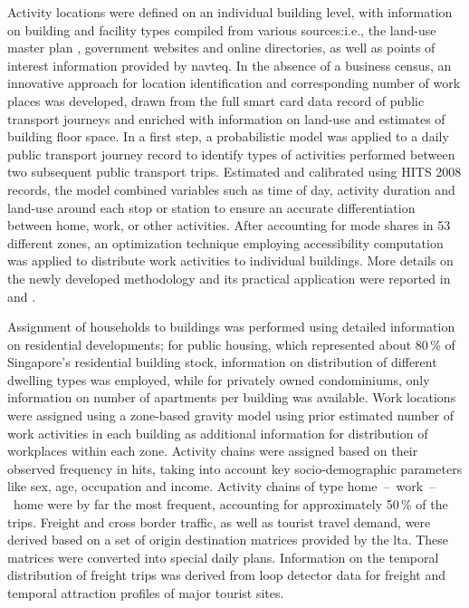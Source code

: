 Activity locations were defined on an individual building level, with  information on building and facility types compiled from various sources:i.e., the land-use master plan \citep[][]{URA_Rep_URA_2008}, government websites and online directories, as well as points of interest information provided by \gls{navteq}. In the absence of a business census, an innovative approach for location identification and corresponding number of work places was developed, drawn from the full smart card data record of public transport journeys and enriched with information on land-use and estimates of building floor space. In a first step, a probabilistic model was applied to a daily public transport journey record to identify types of activities performed between two subsequent public transport trips. Estimated and calibrated using HITS 2008 records, the model combined variables such as time of day, activity duration and land-use around each stop or station to ensure an accurate differentiation between home, work, or other activities. After accounting for mode shares in 53\,different zones, an optimization technique employing accessibility computation was applied to distribute work activities to individual buildings. More details on the newly developed methodology and its practical application were reported in \citet[][]{ChakirovErath_IATBR_2012} and \citet[][]{OrdonezErath_TRR_2013}. 

Assignment of households to buildings was performed using detailed information on residential developments; for public housing, which represented about 80\,\% of Singapore's residential building stock, information on distribution of different dwelling types was employed, while for privately owned condominiums, only information on number of apartments per building was available. Work locations were assigned using a zone-based gravity model using prior estimated number of work activities in each building as additional information for distribution of workplaces within each zone. Activity chains were assigned based on their observed frequency in \gls{hits}, taking into account key socio-demographic parameters like sex, age, occupation and income. Activity chains of type home~--~work~--~home were by far the most frequent, accounting for approximately 50\,\% of the trips.
Freight and cross border traffic, as well as tourist travel demand, were derived based on a set of origin destination matrices provided by the \gls{lta}. These matrices were converted into special daily plans. Information on the temporal distribution of freight trips was derived from loop detector data for freight and temporal attraction profiles of major tourist sites.

